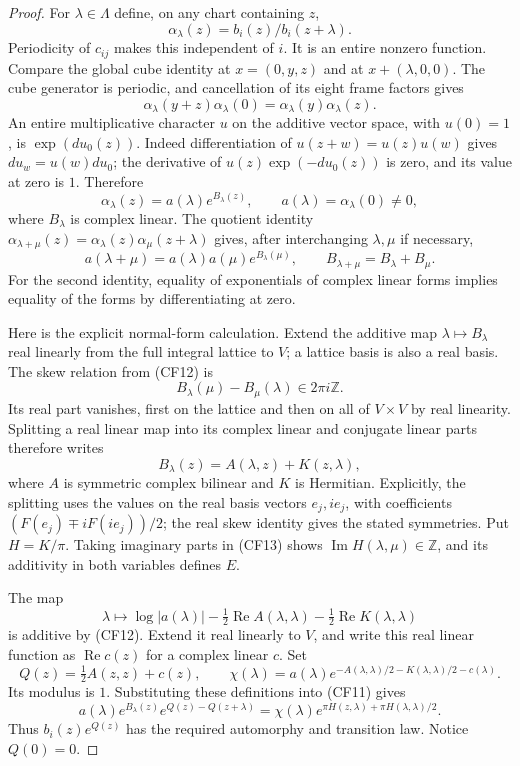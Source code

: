 \begin{proof}
For \(\lambda\in\Lambda\) define, on any chart containing \(z\),
\[
                    \alpha_\lambda(z)=b_i(z)/b_i(z+\lambda).
\]
Periodicity of \(c_{ij}\) makes this independent of \(i\).
It is an entire nonzero function.  Compare the global cube identity
at \(x=(0,y,z)\) and at \(x+(\lambda,0,0)\).
The cube generator is periodic, and cancellation of its eight
frame factors gives
\[
       \alpha_\lambda(y+z)\alpha_\lambda(0)
                         =\alpha_\lambda(y)\alpha_\lambda(z). \tag{CF10}
\]
An entire multiplicative character \(u\) on the additive vector
space, with \(u(0)=1\), is \(\exp(du_0(z))\).
Indeed differentiation of \(u(z+w)=u(z)u(w)\) gives
\(du_w=u(w)du_0\); the derivative of
\(u(z)\exp(-du_0(z))\) is zero, and its value at zero is \(1\).
Therefore
\[
 \alpha_\lambda(z)=a(\lambda)e^{B_\lambda(z)},\qquad
                       a(\lambda)=\alpha_\lambda(0)\ne0,   \tag{CF11}
\]
where \(B_\lambda\) is complex linear.
The quotient identity
\(\alpha_{\lambda+\mu}(z)=
 \alpha_\lambda(z)\alpha_\mu(z+\lambda)\)
gives, after interchanging \(\lambda,\mu\) if necessary,
\[
 a(\lambda+\mu)=a(\lambda)a(\mu)e^{B_\lambda(\mu)},\qquad
              B_{\lambda+\mu}=B_\lambda+B_\mu.              \tag{CF12}
\]
For the second identity, equality of exponentials of complex linear
forms implies equality of the forms by differentiating at zero.

Here is the explicit normal-form calculation.  Extend the additive
map \(\lambda\mapsto B_\lambda\) real linearly from the full integral
lattice to \(V\); a lattice basis is also a real basis.
The skew relation from (CF12) is
\[
        B_\lambda(\mu)-B_\mu(\lambda)\in2\pi i\mathbb Z.     \tag{CF13}
\]
Its real part vanishes, first on the lattice and then on all of
\(V\times V\) by real linearity.
Splitting a real linear map into its complex linear and conjugate
linear parts therefore writes
\[
                   B_\lambda(z)=A(\lambda,z)+K(z,\lambda),
\]
where \(A\) is symmetric complex bilinear and \(K\) is Hermitian.
Explicitly, the splitting uses the values on the real basis vectors
\(e_j,ie_j\), with coefficients
\((F(e_j)\mp iF(ie_j))/2\); the real skew identity gives the stated
symmetries.  Put \(H=K/\pi\).
Taking imaginary parts in (CF13) shows
\(\operatorname{Im}H(\lambda,\mu)\in\mathbb Z\), and its additivity
in both variables defines \(E\).

The map
\[
 \lambda\longmapsto
 \log|a(\lambda)|-\tfrac12\operatorname{Re}A(\lambda,\lambda)
                 -\tfrac12\operatorname{Re}K(\lambda,\lambda)
\]
is additive by (CF12).  Extend it real linearly to \(V\), and write
this real linear function as \(\operatorname{Re}c(z)\) for a complex
linear \(c\).  Set
\[
 Q(z)=\tfrac12 A(z,z)+c(z),\qquad
 \chi(\lambda)=a(\lambda)
   e^{-A(\lambda,\lambda)/2-K(\lambda,\lambda)/2-c(\lambda)} .
\]
Its modulus is \(1\).  Substituting these definitions into (CF11)
gives
\[
 a(\lambda)e^{B_\lambda(z)}e^{Q(z)-Q(z+\lambda)}
       =\chi(\lambda)e^{\pi H(z,\lambda)+\pi H(\lambda,\lambda)/2}.
\]
Thus \(b_i(z)e^{Q(z)}\) has the required automorphy and transition
law.  Notice \(Q(0)=0\).


\end{proof}
